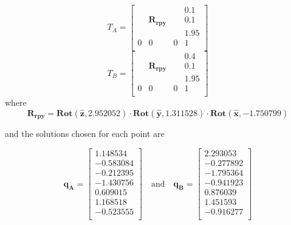 \[
T_A = 
\begin{bmatrix}
  &            &   & 0.1 \\
  & \mathbf{R_{rpy}} &   & 0.1 \\
  &            &   & 1.95 \\
0 &     0      & 0 & 1 \\
\end{bmatrix}
\]
\[
T_B = 
\begin{bmatrix}
  &            &   & 0.4 \\
  & \mathbf{R_{rpy}} &   & 0.1 \\
  &            &   & 1.95 \\
0 &     0      & 0 & 1 \\
\end{bmatrix}
\]
where 
\[
\mathbf{R_{rpy}} = \mathbf{Rot}(\mathbf{\hat{z}}, 2.952052) \cdot \mathbf{Rot}(\mathbf{\hat{y}}, 1.311528) \cdot \mathbf{Rot}(\mathbf{\hat{x}}, -1.750799)
\]

and the solutions chosen for each point are

\[
\mathbf{q_A} =
\begin{bmatrix}
1.148534 \\
-0.583084 \\ 
-0.212395 \\ 
-1.430756 \\
0.609015 \\ 
1.168518 \\ 
-0.523555 \\
\end{bmatrix}
\quad \textrm{and} \quad
\mathbf{q_B} = 
\begin{bmatrix}
2.293053 \\ 
-0.277892 \\
-1.795364 \\ 
-0.941923 \\ 
0.876039 \\
1.451593 \\
-0.916277 \\
\end{bmatrix}
\]

